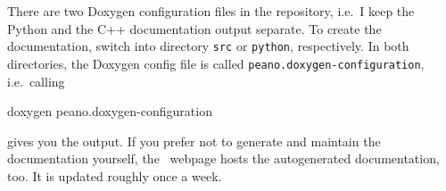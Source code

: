 There are two Doxygen configuration files in the repository, i.e.~I keep the
Python and the C++ documentation output separate.
To create the documentation, switch into directory \texttt{src} or
\texttt{python}, respectively. 
In both directories, the Doxygen config file is called
\texttt{peano.doxygen-configuration}, i.e.~calling

\begin{code}
doxygen peano.doxygen-configuration
\end{code}

\noindent
gives you the output. If you prefer not to generate and maintain the
documentation yourself, the \Peano\ webpage hosts the autogenerated
documentation, too.
It is updated roughly once a week.


